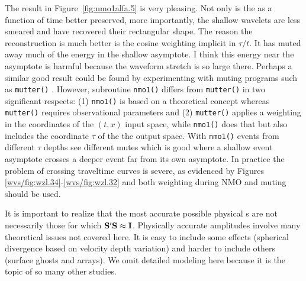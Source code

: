 The result in Figure~\ref{fig:nmo1alfa.5} is very pleasing.
Not only is the  as a function of time better preserved,
more importantly, the shallow wavelets are less smeared
and have recovered their rectangular shape.
The reason the reconstruction is much better is
the cosine weighting implicit in $\tau/t$.
It has muted away much of the energy in the shallow asymptote.
I think this energy near the asymptote is harmful
because the waveform stretch is so large there.
Perhaps a similar good result could be found by experimenting
with muting programs such as \texttt{mutter()} .
However, subroutine \texttt{nmo1()}  differs from {\tt mutter()}
in two significant respects:
(1) {\tt nmo1()} is based on a theoretical concept
whereas {\tt mutter()} requires observational parameters
and (2) {\tt mutter()} applies a weighting in
the coordinates of the $(t,x)$ input space,
while {\tt nmo1()} does that
but also includes the coordinate $\tau$ of the the output space.
With {\tt nmo1()} events from different $\tau$ depths see different mutes
which is good where a shallow event asymptote
crosses a deeper event far from its own asymptote.
In practice the problem of crossing traveltime curves is severe,
as evidenced by
Figures \ref{wvs/fig:wzl.34}-\ref{wvs/fig:wzl.32}
and both weighting during NMO and muting should be used.


It is important to realize that the most accurate possible
physical s are not necessarily those for which
$\bold S'\bold S\approx \bold I$.
Physically accurate amplitudes involve many theoretical
issues not covered here.
It is easy to include some effects
(spherical divergence based on velocity depth variation)
and harder to include others
(surface ghosts and arrays).
We omit detailed modeling here
because it is the topic of so many other studies.

